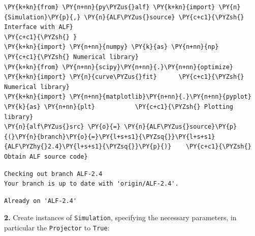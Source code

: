     \begin{tcolorbox}[breakable, size=fbox, boxrule=1pt, pad at break*=1mm,colback=cellbackground, colframe=cellborder]
\begin{Verbatim}[commandchars=\\\{\}]
\PY{k+kn}{from} \PY{n+nn}{py\PYZus{}alf} \PY{k+kn}{import} \PY{n}{Simulation}\PY{p}{,} \PY{n}{ALF\PYZus{}source} \PY{c+c1}{\PYZsh{} Interface with ALF}
\PY{c+c1}{\PYZsh{} }
\PY{k+kn}{import} \PY{n+nn}{numpy} \PY{k}{as} \PY{n+nn}{np}                        \PY{c+c1}{\PYZsh{} Numerical library}
\PY{k+kn}{from} \PY{n+nn}{scipy}\PY{n+nn}{.}\PY{n+nn}{optimize} \PY{k+kn}{import} \PY{n}{curve\PYZus{}fit}      \PY{c+c1}{\PYZsh{} Numerical library}
\PY{k+kn}{import} \PY{n+nn}{matplotlib}\PY{n+nn}{.}\PY{n+nn}{pyplot} \PY{k}{as} \PY{n+nn}{plt}           \PY{c+c1}{\PYZsh{} Plotting library}
\PY{n}{alf\PYZus{}src} \PY{o}{=} \PY{n}{ALF\PYZus{}source}\PY{p}{(}\PY{n}{branch}\PY{o}{=}\PY{l+s+s1}{\PYZsq{}}\PY{l+s+s1}{ALF\PYZhy{}2.4}\PY{l+s+s1}{\PYZsq{}}\PY{p}{)}    \PY{c+c1}{\PYZsh{} Obtain ALF source code}
\end{Verbatim}
\end{tcolorbox}

    \begin{Verbatim}[commandchars=\\\{\}]
Checking out branch ALF-2.4
Your branch is up to date with 'origin/ALF-2.4'.
    \end{Verbatim}

    \begin{Verbatim}[commandchars=\\\{\}]
Already on 'ALF-2.4'
    \end{Verbatim}

    \textbf{2.} Create instances of \texttt{Simulation}, specifying the
necessary parameters, in particular the \texttt{Projector} to
\texttt{True}:

